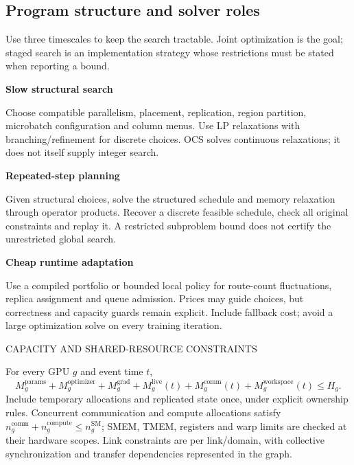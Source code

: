 \documentclass[10pt]{article}
\newcommand{\mono}{\ttfamily}
\newcommand{\lede}[1]{{\color{ink2}#1\par}\vspace{2pt}}
\newcommand{\ct}[1]{{\mono\fontsize{7.2}{8}\selectfont\color{ink2}\MakeUppercase{#1}}\par\vspace{2pt}}
\newcommand{\qa}[2]{%
\begin{card}
  {\sffamily\bfseries\fontsize{10.3}{12.5}\selectfont #1}\par\vspace{3pt}
  {\color{ink2}\fontsize{9}{11.6}\selectfont #2\par}
\end{card}\vspace{3pt}}
\begin{document}
\clearpage
\subsection{Program structure and solver roles}
\lede{Use three timescales to keep the search tractable. Joint optimization is
the goal; staged search is an implementation strategy whose restrictions must
be stated when reporting a bound.}
\qa{Slow structural search}{Choose compatible parallelism, placement,
replication, region partition, microbatch configuration and column menus.
Use LP relaxations with branching/refinement for discrete choices. OCS solves
continuous relaxations; it does not itself supply integer search.}
\qa{Repeated-step planning}{Given structural choices, solve the structured
schedule and memory relaxation through operator products. Recover a discrete
feasible schedule, check all original constraints and replay it. A restricted
subproblem bound does not certify the unrestricted global search.}
\qa{Cheap runtime adaptation}{Use a compiled portfolio or bounded local policy
for route-count fluctuations, replica assignment and queue admission. Prices
may guide choices, but correctness and capacity guards remain explicit. Include
fallback cost; avoid a large optimization solve on every training iteration.}

\begin{card}
\ct{Capacity and shared-resource constraints}
For every GPU $g$ and event time $t$,
\[
 M_g^{\mathrm{params}}+M_g^{\mathrm{optimizer}}+M_g^{\mathrm{grad}}
 +M_g^{\mathrm{live}}(t)+M_g^{\mathrm{comm}}(t)
 +M_g^{\mathrm{workspace}}(t)\le H_g.
\]
Include temporary allocations and replicated state once, under explicit
ownership rules. Concurrent communication and compute allocations satisfy
$n_g^{\mathrm{comm}}+n_g^{\mathrm{compute}}\le n_g^{\mathrm{SM}}$;
SMEM, TMEM, registers and warp limits are checked at their hardware scopes.
Link constraints are per link/domain, with collective synchronization and
transfer dependencies represented in the graph.
\end{card}
\end{document}
